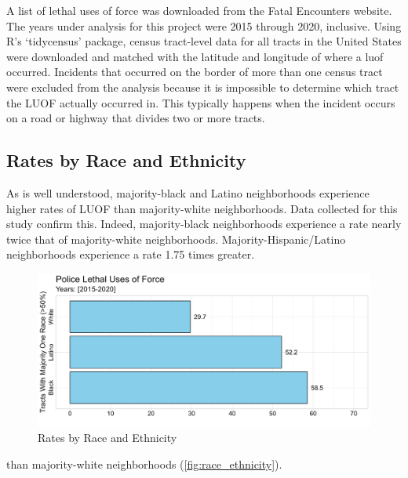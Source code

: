 \documentclass[12pt]{article}
\begin{document}
A list of lethal uses of force was downloaded from the Fatal Encounters website. The years under analysis for this project were 2015 through 2020, inclusive. Using R’s ‘tidycensus’ package, census tract-level data for all tracts in the United States were downloaded and matched with the latitude and longitude of where a \gls{luof} occurred. Incidents that occurred on the border of more than one census tract were excluded from the analysis because it is impossible to determine which tract the LUOF actually occurred in. This typically happens when the incident occurs on a road or highway that divides two or more tracts.

\subsection{Rates by Race and Ethnicity}

As is well understood, majority-black and Latino neighborhoods experience higher rates of LUOF than majority-white neighborhoods. Data collected for this study confirm this. Indeed, majority-black neighborhoods experience a rate nearly twice that of majority-white neighborhoods. Majority-Hispanic/Latino neighborhoods experience a rate 1.75 times greater.

\begin{figure}[H]
  \centering %
  \includegraphics[width=\linewidth]{images/majority_race_only_ind}
  \captionsetup{justification=centering, margin=2cm}
  \caption[Rates by Race and Ethnicity]{Rates by Race and Ethnicity}
  \label{fig:race_ethnicity}
\end{figure}

\noindent{}than majority-white neighborhoods (\autoref{fig:race_ethnicity}).
\end{document}

